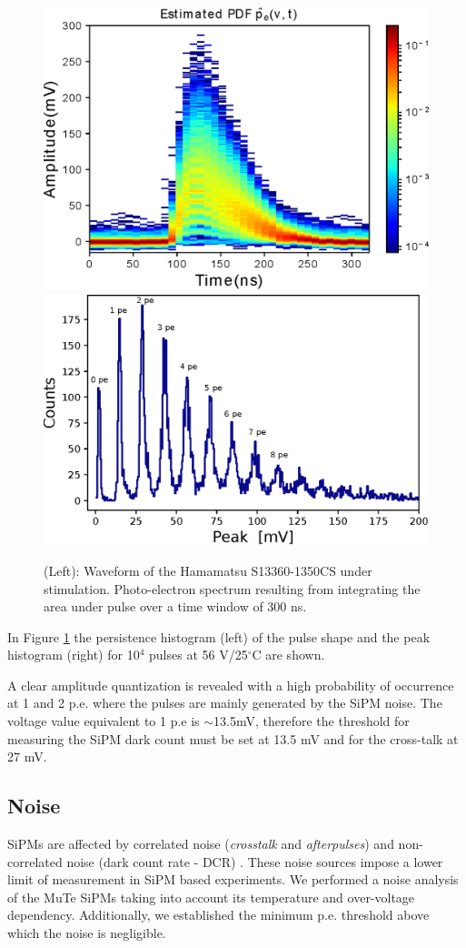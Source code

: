 \documentclass[a4paper,11pt]{article}
\begin{document}
\begin{figure}[htbp]
\centering %
\includegraphics[width=.48\textwidth]{Figures/PDF_1350CS.eps}
\includegraphics[width=.49\textwidth]{Figures/Peak_1350CS.eps}
\caption{\label{fig:peak} (Left): Waveform of the Hamamatsu S13360-1350CS under stimulation. Photo-electron spectrum resulting from integrating the area under pulse over a time window of 300 ns.}
\end{figure}

In Figure \ref{fig:peak} the persistence histogram (left) of the pulse shape and the peak histogram (right) for 10$^4$ pulses at 56 V/25$^{\circ}$C are shown.

A clear amplitude quantization is revealed with a high probability of occurrence at 1 and 2 p.e. where the pulses are mainly generated by the SiPM noise. The voltage value equivalent to 1 p.e is $\sim$13.5mV, therefore the threshold for measuring the SiPM dark count must be set at 13.5 mV and for the cross-talk at 27 mV.

\subsection{Noise}

SiPMs are affected by correlated noise (\textit{crosstalk} and \textit{afterpulses}) and non-correlated noise (dark count rate - DCR) \cite{Baudis2018}. These noise sources impose a lower limit of measurement in SiPM based experiments. We performed a noise analysis of the MuTe SiPMs taking into account its temperature and over-voltage dependency. Additionally, we established the minimum p.e. threshold above which the noise is negligible.
\end{document}
